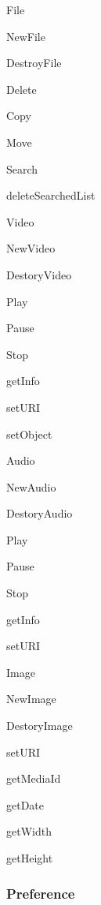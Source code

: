 \begin{DoxyItemize}
\item File
\begin{DoxyItemize}
\item New\-File
\item Destroy\-File
\item Delete
\item Copy
\item Move
\item Search
\item delete\-Searched\-List
\end{DoxyItemize}
\item Video
\begin{DoxyItemize}
\item New\-Video
\item Destory\-Video
\item Play
\item Pause
\item Stop
\item get\-Info
\item set\-U\-R\-I
\item set\-Object
\end{DoxyItemize}
\item Audio
\begin{DoxyItemize}
\item New\-Audio
\item Destory\-Audio
\item Play
\item Pause
\item Stop
\item get\-Info
\item set\-U\-R\-I
\end{DoxyItemize}
\item Image
\begin{DoxyItemize}
\item New\-Image
\item Destory\-Image
\item set\-U\-R\-I
\item get\-Media\-Id
\item get\-Date
\item get\-Width
\item get\-Height
\end{DoxyItemize}
\end{DoxyItemize}

\subsubsection*{Preference}


